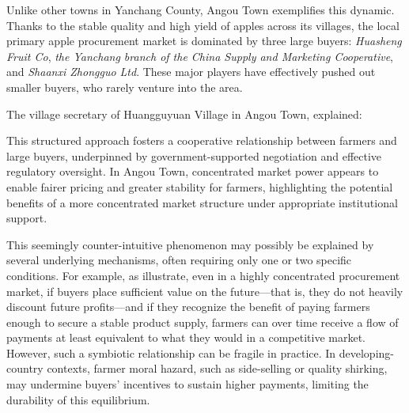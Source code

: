 Unlike other towns in Yanchang County, Angou Town exemplifies this dynamic. Thanks to the stable quality and high yield of apples across its villages, the local primary apple procurement market is dominated by three large buyers: \textit{Huasheng Fruit Co}, \textit{the Yanchang branch of the China Supply and Marketing Cooperative}, and \textit{Shaanxi Zhongguo Ltd}. These major players have effectively pushed out smaller buyers, who rarely venture into the area.

The village secretary of Huangguyuan Village in Angou Town, explained:
\begin{quote}
\end{quote}
This structured approach fosters a cooperative relationship between farmers and large buyers, underpinned by government-supported negotiation and effective regulatory oversight. In Angou Town, concentrated market power appears to enable fairer pricing and greater stability for farmers, highlighting the potential benefits of a more concentrated market structure under appropriate institutional support.


This seemingly counter-intuitive phenomenon may possibly be explained by several underlying mechanisms, often requiring only one or two specific conditions. For example, as \citet{sexton2018increasing} illustrate, even in a highly concentrated procurement market, if buyers place sufficient value on the future—that is, they do not heavily discount future profits—and if they recognize the benefit of paying farmers enough to secure a stable product supply, farmers can over time receive a flow of payments at least equivalent to what they would in a competitive market. However, such a symbiotic relationship can be fragile in practice. In developing-country contexts, farmer moral hazard, such as side-selling or quality shirking, may undermine buyers’ incentives to sustain higher payments, limiting the durability of this equilibrium.




